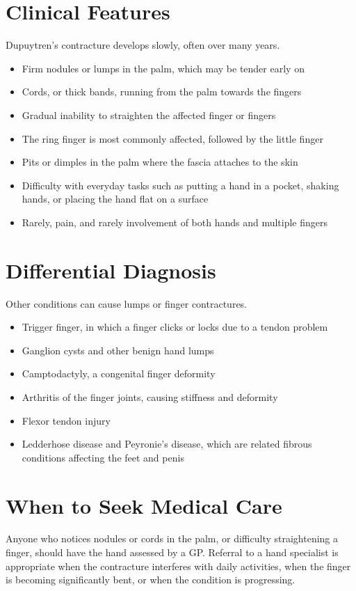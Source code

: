 \section*{Clinical Features}
Dupuytren's contracture develops slowly, often over many years.
\begin{itemize}
    \item Firm nodules or lumps in the palm, which may be tender early on
    \item Cords, or thick bands, running from the palm towards the fingers
    \item Gradual inability to straighten the affected finger or fingers
    \item The ring finger is most commonly affected, followed by the little finger
    \item Pits or dimples in the palm where the fascia attaches to the skin
    \item Difficulty with everyday tasks such as putting a hand in a pocket, shaking hands, or placing the hand flat on a surface
    \item Rarely, pain, and rarely involvement of both hands and multiple fingers
\end{itemize}

\section*{Differential Diagnosis}
Other conditions can cause lumps or finger contractures.
\begin{itemize}
    \item Trigger finger, in which a finger clicks or locks due to a tendon problem
    \item Ganglion cysts and other benign hand lumps
    \item Camptodactyly, a congenital finger deformity
    \item Arthritis of the finger joints, causing stiffness and deformity
    \item Flexor tendon injury
    \item Ledderhose disease and Peyronie's disease, which are related fibrous conditions affecting the feet and penis
\end{itemize}

\section*{When to Seek Medical Care}
Anyone who notices nodules or cords in the palm, or difficulty straightening a finger, should have the hand assessed by a GP. Referral to a hand specialist is appropriate when the contracture interferes with daily activities, when the finger is becoming significantly bent, or when the condition is progressing.

